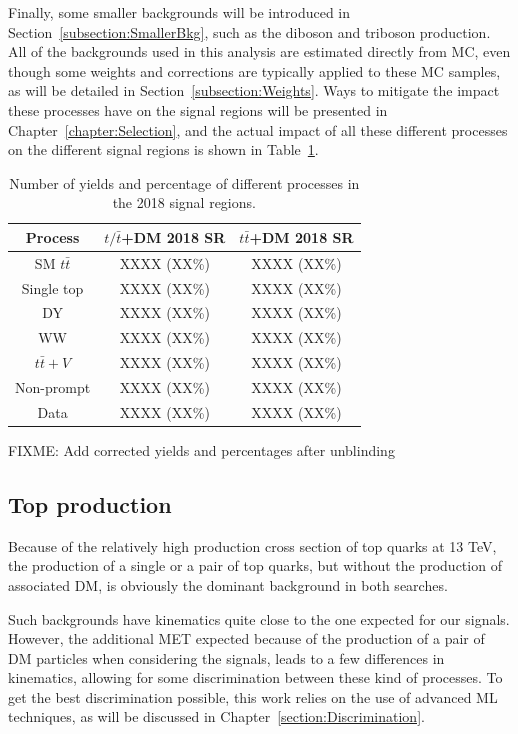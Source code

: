 \documentclass[a4paper, 10pt, openright]{report}
\begin{document}
Finally, some smaller backgrounds will be introduced in Section~\ref{subsection:SmallerBkg}, such as the diboson and triboson production. All of the backgrounds used in this analysis are estimated directly from \ac{MC}, even though some weights and corrections are typically applied to these \ac{MC} samples, as will be detailed in Section~\ref{subsection:Weights}. Ways to mitigate the impact these processes have on the signal regions will be presented in Chapter~\ref{chapter:Selection}, and the actual impact of all these different processes on the different signal regions is shown in Table~\ref{tab:yields}.

\begin{table}
\begin{center}
\begin{tabular}{ c|c|c } 
 \hline
 Process & $t/\bar t$+DM 2018 \ac{SR} & $t \bar t$+DM 2018 \ac{SR} \\
 \hline
 \ac{SM} $t \bar t$ & XXXX (XX\%) & XXXX (XX\%) \\
 Single top & XXXX (XX\%) & XXXX (XX\%) \\
 DY & XXXX (XX\%) & XXXX (XX\%) \\
 WW & XXXX (XX\%) & XXXX (XX\%) \\
 $t \bar t + V$ & XXXX (XX\%) & XXXX (XX\%) \\
 Non-prompt & XXXX (XX\%) & XXXX (XX\%) \\
 \hline
 Data & XXXX (XX\%) & XXXX (XX\%) \\
 \hline
\end{tabular}
\caption{Number of yields and percentage of different processes in the 2018 signal regions.}
\label{tab:yields}
\end{center}
\end{table}	

\color{red} FIXME: Add corrected yields and percentages after unblinding \color{black}

\subsection{Top production}

Because of the relatively high production cross section of top quarks at 13 TeV, the production of a single or a pair of top quarks, but without the production of associated \ac{DM}, is obviously the dominant background in both searches. 

Such backgrounds have kinematics quite close to the one expected for our signals. However, the additional \ac{MET} expected because of the production of a pair of \ac{DM} particles when considering the signals, leads to a few differences in kinematics, allowing for some discrimination between these kind of processes. To get the best discrimination possible, this work relies on the use of advanced \acf{ML} techniques, as will be discussed in Chapter~\ref{section:Discrimination}.
\end{document}
